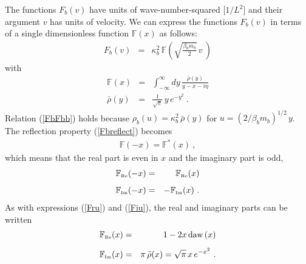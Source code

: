\documentclass[preprint,12pt,eqsecnum,nofootinbib,amsmath,amssymb]{revtex4}
\newcommand{\smRe}{{\rm\scriptscriptstyle Re}}
\newcommand{\smIm}{{\rm\scriptscriptstyle Im}}
\begin{document}
{{{{{{{The functions $F_b(v)$ have units of wave-number-squared 
[$1/L^2$] and their argument $v$ has units of velocity.
We can express the functions $F_b(v)$ in terms of a single
dimensionless function $\mathbb F(x)$ as follows:
\begin{eqnarray}
  F_b(v) 
  &=& 
  \kappa_b^2 \,\mathbb{F}\left(
  \sqrt{\frac{\beta_b m_b}{2}}\, v ~ \right)
\label{FbFbb}
\end{eqnarray}
with
\begin{eqnarray}
  \mathbb{F}(x) 
  &=& 
  \int_{-\infty}^\infty dy\, \frac{\bar\rho(y)}{y - x - i \eta} 
\\[5pt]
  \bar\rho(y)&=& \frac{1}{\sqrt{\pi}}\,y\,e^{-y^2}  \ .
\end{eqnarray}
Relation (\ref{FbFbb}) holds because $\rho_b(u) = \kappa_b^2\,\bar
\rho(y)$ for $u=(2/\beta_b m_b)^{1/2}\, y$.  The reflection property
(\ref{Fbreflect}) becomes
\begin{eqnarray}
  \mathbb{F}(-x) = \mathbb{F}^*(x) \  ,
\label{Freflect}
\end{eqnarray}
which means that the real part is even in $x$ and the imaginary
part is odd,
\begin{eqnarray}
  \mathbb{F}_\smRe(-x) &=& \phantom{-}\mathbb{F}_\smRe(x)
\\[5pt]
  \mathbb{F}_\smIm(-x) &=& -\mathbb{F}_\smIm(x) \ .
\end{eqnarray}
As with expressions (\ref{Fru}) and (\ref{Fiu}), the real and
imaginary parts can be written
\begin{eqnarray}
  \mathbb{F}_\smRe(x)
  &=& 
  1 - 2 x\,  {\rm daw}\left(x  \right) 
\label{FbarRe}
\\[5pt]
  \mathbb{F}_\smIm(x)
  &=&
  \pi\,  \bar\rho(x)  
  =
  \sqrt{\pi}\, x\, e^{-x^2}\ .
\label{FbarIm}
\end{eqnarray}



}}}}}}}
\end{document}
